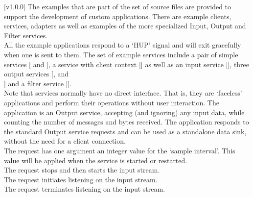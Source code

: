 [v1.0.0]
The examples that are part of the \mplusm{} set of source files are provided to support
the development of custom applications.
There are example clients, services, adapters as well as examples of the more specialized
Input, Output and Filter services.\\

All the example applications respond to a `HUP' signal and will exit gracefully when one
is sent to them.
The set of example services include a pair of simple services
[ and
], a service with client context
[] as well as an input service
[], three output services
[,
 and\\
] and a filter service
[].\\

Note that services normally have no direct interface.
That is, they are `faceless' applications and perform their operations without user
interaction.
The  application is an Output
service, accepting (and ignoring) any input data, while counting the number of messages
and bytes received.
The application responds to the standard Output service requests and can be used as a
standalone data sink, without the need for a client connection.\\

The  request has one argument
\longDash{} an integer value for the `sample interval'.
This value will be applied when the service is started or restarted.\\

The  request stops and then
starts the input stream.\\

The  request initiates listening
on the input stream.\\

The  request terminates listening
on the input stream.\\

